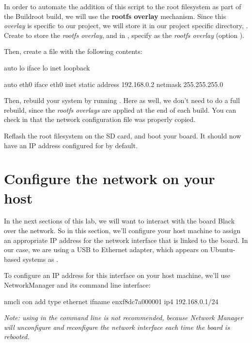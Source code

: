 In order to automate the addition of this script to the root
filesystem as part of the Buildroot build, we will use the {\bf rootfs
  overlay} mechanism. Since this {\em overlay} is specific to our
project, we will store it in our project specific directory,
. Create
 to store the {\em rootfs
  overlay}, and in , specify
 as the {\em rootfs
  overlay} (option ).

Then, create a
file with the following contents:

\begin{fileinput}
auto lo
iface lo inet loopback

auto eth0
iface eth0 inet static
      address 192.168.0.2
      netmask 255.255.255.0
\end{fileinput}

Then, rebuild your system by running . Here as well, we
don't need to do a full rebuild, since the {\em rootfs overlays} are
applied at the end of each build. You can check in
 that the network configuration file
was properly copied.

Reflash the root filesystem on the SD card, and boot your board. It
should now have an IP address configured for  by default.

\section{Configure the network on your host}

In the next sections of this lab, we will want to interact with the
board Black over the network. So in this section, we'll configure your
host machine to assign an appropriate IP address for the network
interface that is linked to the board. In our case, we are using a USB
to Ethernet adapter, which appears on Ubuntu-based systems as
.

To configure an IP address for this interface on your host machine,
we'll use NetworkManager and its command line interface:

\begin{bashinput}
nmcli con add type ethernet ifname enxf8dc7a000001 ip4 192.168.0.1/24
\end{bashinput}

{\em Note: using  in the command line is not recommended,
  because Network Manager will unconfigure and reconfigure the network
  interface each time the board is rebooted.}

